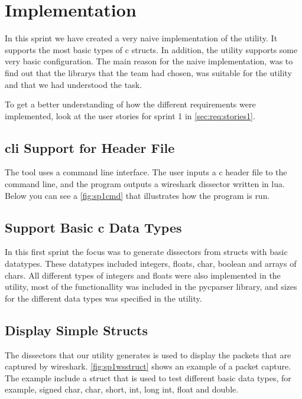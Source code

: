 \section{Implementation}
\label{sec:sp1:impl}
In this sprint we have created a very naive implementation of the \gls{utility}. It
supports the most basic types of \Gls{c} \glspl{struct}. In addition, the \gls{utility} supports
some very basic configuration. The main reason for the naive implementation, 
was to find out that the \glspl{library} that the team had chosen, was suitable for 
the \gls{utility} and that we had understood the task.

To get a better understanding of how the different requirements were implemented,
look at the user stories for sprint 1 in \autoref{sec:req:stories1}.


\subsection{\gls{cli} Support for Header File}
The tool uses a command line interface. The user inputs a \Gls{c} \gls{header} file to the 
command line, and the program outputs a \Gls{wireshark} \gls{dissector} written in \Gls{lua}. 
Below you can see a \autoref{fig:sp1cmd} that illustrates how the program is 
run. 

\subsection{Support Basic \Gls{c} Data Types}
In this first sprint the focus was to generate \glspl{dissector} from \glspl{struct} with 
basic datatypes. These datatypes included \glspl{integer}, \glspl{float}, \gls{char}, \gls{boolean} and 
\glspl{array} of \glspl{char}. All different types of \glspl{integer} and \glspl{float} were also 
implemented in the \gls{utility}, most of the functionallity was included in the 
\gls{pycparser} \gls{library}, and sizes for the different data types was specified in the 
\gls{utility}.

\subsection{Display Simple Structs}
The \glspl{dissector} that our \gls{utility} generates is used to display the \glspl{packet} that 
are captured by wireshark. \autoref{fig:sp1wsstruct} shows an example of a 
\gls{packet} capture. The example include a \gls{struct} that is used to test different 
basic data types, for example, signed \gls{char}, \gls{char}, short, \gls{int}, long \gls{int}, \gls{float} 
and \gls{double}.

